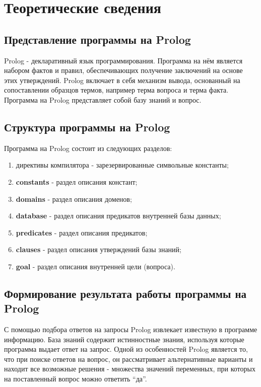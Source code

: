\chapter{Теоретические сведения}

\section{Представление программы на Prolog}

Prolog - декларативный язык программирования. Программа на нём является набором фактов и правил, обеспечивающих получение заключений на основе этих утверждений. Prolog включает в себя механизм вывода, основанный на сопоставлении образцов термов, например терма вопроса и терма факта. Программа на Prolog представляет собой базу знаний и вопрос.

\section{Структура программы на Prolog}

Программа на Prolog состоит из следующих разделов:
\begin{enumerate}
    \item директивы компилятора - зарезервированные символьные константы;
    \item \textbf{constants} - раздел описания констант;
    \item \textbf{domains} - раздел описания доменов;
    \item \textbf{database} - раздел описания предикатов внутренней базы данных;
    \item \textbf{predicates} - раздел описания предикатов;
    \item \textbf{clauses} - раздел описания утверждений базы знаний;
    \item \textbf{goal} - раздел описания внутренней цели (вопроса).
\end{enumerate}

\section{Формирование результата работы программы на Prolog}

С помощью подбора ответов на запросы Prolog извлекает известную в программе информацию. База знаний содержит истинностные знания, используя которые программа выдает ответ на запрос. Одной из особенностей Prolog является то, что при поиске ответов на вопрос, он рассматривает альтернативные варианты и находит все возможные решения - множества значений переменных, при которых на поставленный вопрос можно ответить ``да''.

